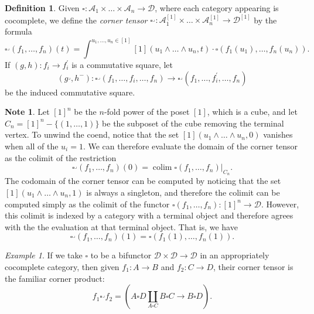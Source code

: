 \documentclass[a4paper]{article}
\numberwithin{equation}{subsection}
\theoremstyle{plain}   %
\theoremstyle{definition}
\newtheorem{defn}[equation]{Definition}
\newtheorem{note}[equation]{Note}
\theoremstyle{remark}
\newtheorem{example}[equation]{Example}
\theoremstyle{plain}
\DeclareMathOperator{\colim}{colim}
\begin{document}
\begin{defn}
	Given \(\square:\mathcal{A}_1\times \dots \times \mathcal{A}_n \to \mathcal{D}\), where each category appearing is cocomplete, we define the \emph{corner tensor} \(\square^\lrcorner:\mathcal{A}_1^{[1]}\times \dots \times \mathcal{A}_n^{[1]} \to \mathcal{D}^{[1]}\) by the formula
	\[\square^\lrcorner(f_1,\dots,f_n)(t)=\int^{u_1,\dots,u_n\in [1]} [1](u_1\wedge\dots\wedge u_n, t) \cdot \square(f_1(u_1),\dots,f_n(u_n)).\]
	If \((g,h): f_i\to f^\prime_i\) is a commutative square, let 
	\[
		(g^\lrcorner,h^{-}):\square^\lrcorner(f_1,\dots,f_i,\dots,f_n) \to \square^\lrcorner(f_1,\dots,f^\prime_i,\dots,f_n)
	\]
	be the induced commutative square.  
\end{defn}
\begin{note}
	Let \([1]^n\) be the \(n\)-fold power of the poset \([1]\), which is a cube, and let \(C_n=[1]^n - \{(1,\dots,1)\}\) be the subposet of the cube removing the terminal vertex.  To unwind the coend, notice that the set \([1](u_1\wedge \dots \wedge u_n,0)\) vanishes when all of the \(u_i=1\).  We can therefore evaluate the domain of the corner tensor as the colimit of the restriction
	\[
		\square^\lrcorner(f_1,\dots,f_n)(0)=\colim \left.\square(f_1,\dots,f_n)\right|_{C_n}.
	\]
	The codomain of the corner tensor can be computed by noticing that the set \([1](u_1\wedge \dots \wedge u_n,1)\) is always a singleton, and therefore the colimit can be computed simply as the colimit of the functor \(\square(f_1,\dots,f_n):[1]^n \to \mathcal{D}\).  However, this colimit is indexed by a category with a terminal object and therefore agrees with the the evaluation at that terminal object. That is, we have
	\[
		\square^\lrcorner(f_1,\dots,f_n)(1)=\square(f_1(1),\dots,f_n(1)).
	\]  
\end{note}
\begin{example}
	If we take \(\square\) to be a bifunctor \(\mathcal{D}\times \mathcal{D} \to \mathcal{D}\) in an appropriately cocomplete category, then given \(f_1:A\to B\) and \(f_2:C\to D\), their corner tensor is the familiar corner product: 
	\[
		f_1 \square^\lrcorner f_2 = \left(A\square D \coprod_{A\square C} B\square C \to  B\square D\right).
	\]
\end{example}
\end{document}
